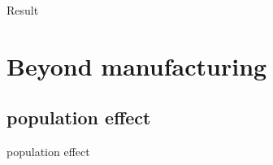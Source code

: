 \documentclass[10pt,aspectratio=43,mathserif,table]{beamer}
\begin{document}
\begin{frame}{Result}
	\begin{figure}[thpb]
		\centering
	\end{figure}
\end{frame}


\section{Beyond manufacturing}
\subsection{population effect}
\begin{frame}{population effect}
	\begin{figure}[thpb]
		\centering
	\end{figure}
\end{frame}
\end{document}
